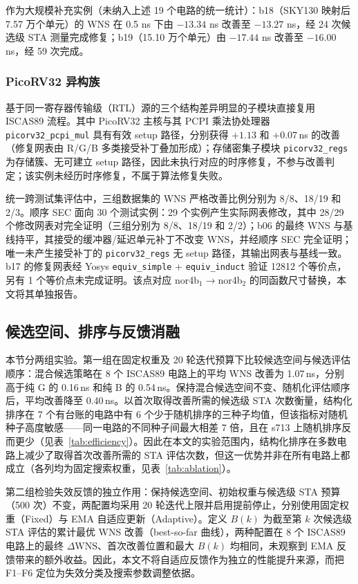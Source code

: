 \documentclass[twocolumn,10pt,fontset=windows]{ctexart}
\begin{document}
作为大规模补充实例（未纳入上述 19 个电路的统一统计）：b18（SKY130 映射后 7.57 万个单元）的 WNS 在 0.5 ns 下由 $-13.34$ ns 改善至 $-13.27$ ns，经 24 次候选级 STA 测量完成修复；b19（15.10 万个单元）由 $-17.44$ ns 改善至 $-16.00$ ns，经 59 次完成。

\subsubsection{PicoRV32 异构族}

基于同一寄存器传输级（RTL）源的三个结构差异明显的子模块直接复用 ISCAS89 流程。其中 PicoRV32 主核与其 PCPI 乘法协处理器 \texttt{picorv32\_pcpi\_mul} 具有有效 setup 路径，分别获得 $+1.13$ 和 $+0.07\,$ns 的改善（修复网表由 R/G/B 多类接受补丁叠加形成）；存储密集子模块 \texttt{picorv32\_regs} 为存储簇、无可建立 setup 路径，因此未执行对应的时序修复，不参与改善判定；该实例未经历时序修复，不属于算法修复失败。

统一跨测试集评估中，三组数据集的 WNS 严格改善比例分别为 8/8、18/19 和 2/3。顺序 SEC 面向 30 个测试实例：29 个实例产生实际网表修改，其中 28/29 个修改网表对完全证明（三组分别为 8/8、18/19 和 2/2）；b06 的最终 WNS 与基线持平，其接受的缓冲器/延迟单元补丁不改变 WNS，并经顺序 SEC 完全证明；唯一未产生接受补丁的 \texttt{picorv32\_regs} 无 setup 路径，其输出网表与基线一致。b17 的修复网表经 Yosys \texttt{equiv\_simple} + \texttt{equiv\_induct} 验证 12812 个等价点，另有 1 个等价点未完成证明。该点对应 nor4b$_1\!\to\!$nor4b$_2$ 的同函数尺寸替换，本文将其单独报告。

\subsection{候选空间、排序与反馈消融}\label{sec:ablation}

本节分两组实验。第一组在固定权重及 20 轮迭代预算下比较候选空间与候选评估顺序：混合候选策略在 8 个 ISCAS89 电路上的平均 WNS 改善为 1.07\,ns，分别高于纯 G 的 0.16\,ns 和纯 B 的 0.54\,ns。保持混合候选空间不变、随机化评估顺序后，平均改善降至 0.40\,ns。以首次取得改善所需的候选级 STA 次数衡量，结构化排序在 7 个有台账的电路中有 6 个少于随机排序的三种子均值，但该指标对随机种子高度敏感——同一电路的不同种子间最大相差 7 倍，且在 s713 上随机排序反而更少（见表~\ref{tab:efficiency}）。因此在本文的实验范围内，结构化排序在多数电路上减少了取得首次改善所需的 STA 评估次数，但这一优势并非在所有电路上都成立（各列均为固定搜索权重，见表~\ref{tab:ablation}）。

第二组检验失效反馈的独立作用：保持候选空间、初始权重与候选级 STA 预算（500 次）不变，两配置均采用 20 轮迭代上限并启用提前停止，分别使用固定权重（Fixed）与 EMA 自适应更新（Adaptive）。定义 $B(k)$ 为截至第 $k$ 次候选级 STA 评估的累计最优 WNS 改善（best-so-far 曲线），两种配置在 8 个 ISCAS89 电路上的最终 $\Delta\mathrm{WNS}$、首次改善位置和最大 $B(k)$ 均相同，未观察到 EMA 反馈带来的额外收益。因此，本文不将自适应反馈作为独立的性能提升来源，而把 F1--F6 定位为失效分类及搜索参数调整依据。
\end{document}
